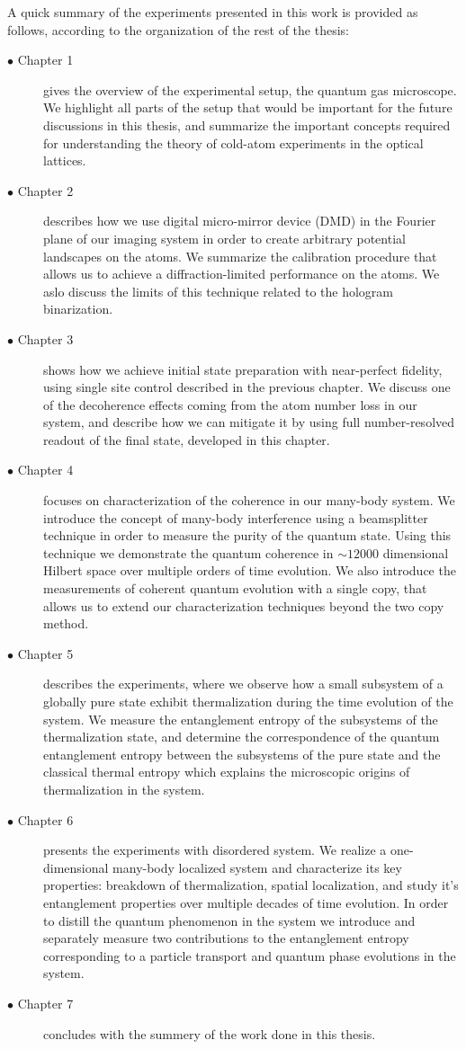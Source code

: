 A quick summary of the experiments presented in this work is provided as follows, according to the organization of the rest of the thesis:
\begin{description}
	\item[$\bullet$ Chapter 1] gives the overview of the experimental setup, the quantum gas microscope. We highlight all parts of the setup that would be important for the future discussions in this thesis, and summarize the important concepts required for understanding the theory of cold-atom experiments in the optical lattices.
	\item[$\bullet$ Chapter 2] describes how we use digital micro-mirror device (DMD) in the Fourier plane of our imaging system in order to create arbitrary potential landscapes on the atoms. We summarize the calibration procedure that allows us to achieve a diffraction-limited performance on the atoms. We aslo discuss the limits of this technique related to the hologram binarization.
	\item[$\bullet$ Chapter 3] shows how we achieve initial state preparation with near-perfect fidelity, using single site control described in the previous chapter. We discuss one of the decoherence effects coming from the atom number loss in our system, and describe how we can mitigate it by using full number-resolved readout of the final state, developed in this chapter.
	\item[$\bullet$ Chapter 4] focuses on characterization of the coherence in our many-body system. We introduce the concept of many-body interference using a beamsplitter technique in order to measure the purity of the quantum state. Using this technique we demonstrate the quantum coherence in $\sim12000$ dimensional Hilbert space over multiple orders of time evolution. We also introduce the measurements of coherent quantum evolution with a single copy, that allows us to extend our characterization techniques beyond the two copy method. 
	\item[$\bullet$ Chapter 5] describes the experiments, where we observe how a small subsystem of a globally pure state exhibit thermalization during the time evolution of the system. We measure the entanglement entropy of the subsystems of the thermalization state, and determine the correspondence of the quantum entanglement entropy between the subsystems of the pure state and the classical thermal entropy%
	 which explains the microscopic origins of thermalization in the system.
	\item[$\bullet$ Chapter 6] presents the experiments with disordered system. We realize a one-dimensional many-body localized system and characterize its key properties: breakdown of thermalization, spatial localization, and study it's entanglement properties over multiple decades of time evolution. In order to distill the quantum phenomenon in the system we introduce and separately measure two contributions to the entanglement entropy corresponding to a particle transport and quantum phase evolutions in the system.
	 \item[$\bullet$ Chapter 7] concludes with the summery of the work done in this thesis.
\end{description}